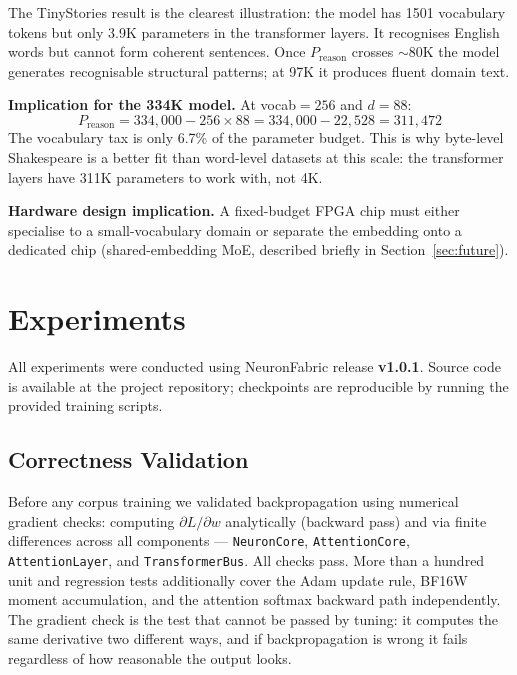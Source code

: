 \documentclass[11pt]{article}
\begin{document}
The TinyStories result is the clearest illustration: the model has 1501 vocabulary
tokens but only 3.9K parameters in the transformer layers. It recognises English
words but cannot form coherent sentences. Once $P_{\text{reason}}$ crosses $\sim$80K
the model generates recognisable structural patterns; at 97K it produces fluent
domain text.

\textbf{Implication for the 334K model.} At vocab$=256$ and $d{=}88$:
\[
P_{\text{reason}} = 334{,}000 - 256 \times 88 = 334{,}000 - 22{,}528 = 311{,}472
\]
The vocabulary tax is only 6.7\% of the parameter budget. This is why byte-level
Shakespeare is a better fit than word-level datasets at this scale: the transformer
layers have 311K parameters to work with, not 4K.

\textbf{Hardware design implication.} A fixed-budget FPGA chip must either
specialise to a small-vocabulary domain or separate the embedding onto a dedicated
chip (shared-embedding MoE, described briefly in Section~\ref{sec:future}).

\section{Experiments}

\label{sec:experiments}

All experiments were conducted using NeuronFabric release \textbf{v1.0.1}.
Source code is available at the project repository; checkpoints are reproducible by running the provided training scripts.

\subsection{Correctness Validation}

Before any corpus training we validated backpropagation using numerical gradient
checks: computing $\partial L / \partial w$ analytically (backward pass) and via
finite differences across all components --- \texttt{NeuronCore},
\texttt{AttentionCore}, \texttt{AttentionLayer}, and \texttt{TransformerBus}.
All checks pass. More than a hundred unit and regression tests additionally cover the Adam update rule, BF16W moment
accumulation, and the attention softmax backward path independently.
The gradient check is the test that cannot be passed by tuning: it computes the
same derivative two different ways, and if backpropagation is wrong it fails
regardless of how reasonable the output looks.
\end{document}
